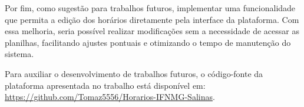 Por fim, como sugestão para trabalhos futuros, implementar uma funcionalidade que permita a edição dos horários diretamente pela interface da plataforma. Com essa melhoria, seria possível realizar modificações sem a necessidade de acessar as planilhas, facilitando ajustes pontuais e otimizando o tempo de manutenção do sistema.

Para auxiliar o desenvolvimento de trabalhos futuros, o código-fonte da plataforma apresentada no trabalho está disponível em: \url{https://github.com/Tomaz5556/Horarios-IFNMG-Salinas}.